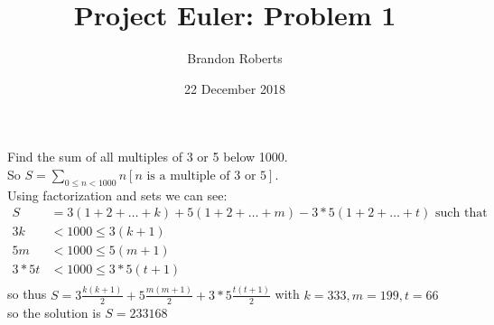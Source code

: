 \documentclass{article}
\begin{document}
\title{Project Euler: Problem 1}
\author{Brandon Roberts}
\date{22 December 2018}

\maketitle

Find the sum of all multiples of 3 or 5 below 1000.\\
So $S=\sum_{0\leq n<1000} n[n\text{ is a multiple of 3 or 5}]$.\\ 
Using factorization and sets we can see:
\begin{align*}
S&=3(1+2+\dots+k)+5(1+2+\dots+m)-3*5(1+2+\dots+t) \text{ such that}\\
3k&<1000\leq 3(k+1)\\
5m&<1000\leq 5(m+1)\\
3*5t&<1000\leq 3*5(t+1)\\
\end{align*}
so thus
$S=3\frac{k(k+1)}{2}+5\frac{m(m+1)}{2}+3*5\frac{t(t+1)}{2}$ with $k=333,m=199,t=66$\\
so the solution is $S=233168$
\end{document}

